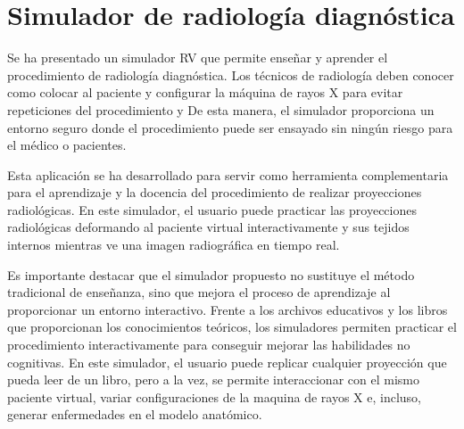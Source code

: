 




\section{Simulador de radiología diagnóstica }
\label{conclu:xray}

Se ha presentado un simulador 
\ac{RV} que permite enseñar y aprender el procedimiento de radiología diagnóstica. Los técnicos de radiología deben conocer como colocar al paciente y configurar la máquina de rayos X para evitar repeticiones del procedimiento y 
De esta manera, el simulador proporciona un entorno seguro donde el procedimiento puede ser ensayado sin ningún riesgo para el médico o pacientes. 

Esta aplicación se ha desarrollado para servir como herramienta complementaria para el aprendizaje y la docencia del procedimiento de realizar proyecciones radiológicas. En este simulador, el usuario puede practicar las proyecciones radiológicas deformando al paciente virtual interactivamente y sus tejidos internos mientras ve una imagen radiográfica en tiempo real. 

Es importante destacar que el simulador propuesto no sustituye el método tradicional de enseñanza, sino que mejora el proceso de aprendizaje al proporcionar un entorno interactivo. Frente a los archivos educativos y los libros que proporcionan los conocimientos teóricos, los simuladores permiten practicar el procedimiento interactivamente para conseguir mejorar las habilidades no cognitivas. En este simulador, el usuario puede replicar cualquier proyección que pueda leer de un libro, pero a la vez, se permite interaccionar con el mismo paciente virtual, variar configuraciones de la maquina de rayos X e, incluso, generar enfermedades en el modelo anatómico.












